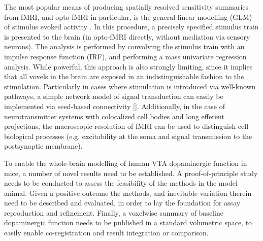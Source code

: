 The most popular means of producing spatially resolved sensitivity summaries from fMRI, and opto-fMRI in particular, is the general linear modelling (GLM) of stimulus evoked activity \cite{Friston1995}.
In this procedure, a precisely specified stimulus train is presented to the brain (in opto-fMRI directly, without mediation via sensory neurons).
The analysis is performed by convolving the stimulus train with an impulse response function (IRF), and performing a mass univariate regression analysis.
While powerful, this approach is also strongly limiting, since it implies that all voxels in the brain are exposed in an indistinguishable fashion to the stimulation.
Particularly in cases where stimulation is introduced via well-known pathways, a simple network model of signal transduction can easily be implemented via seed-based connectivity \cref{}.
Additionally, in the case of neurotransmitter systems with colocalized cell bodies and long efferent projections, the macroscopic resolution of fMRI can be used to distinguish cell biological processes (e.g. excitability at the soma and signal transmission to the postsynaptic membrane).

To enable the whole-brain modelling of human VTA dopaminergic function in mice, a number of novel results need to be established.
A proof-of-principle study needs to be conducted to assess the feasibility of the methods in the model animal.
Given a positive outcome the methods, and inevitable variation therein need to be described and evaluated, in order to lay the foundation for assay reproduction and refinement.
Finally, a voxelwise summary of baseline dopaminergic function needs to be published in a standard volumetric space, to easily enable co-registration and result integration or comparison.
